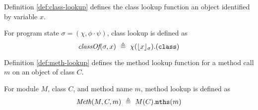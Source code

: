 Definition \ref{def:class-lookup} defines the class lookup function an object 
identified by variable $x$.
\begin{definition}
\label{def:class-lookup}
For program state $\sigma = (\chi, \phi \cdot\psi)$, class lookup is defined as 
$$\class{\sigma}{x}\ \triangleq\ \chi(\interpret{\sigma}{x}).(\prg{class})$$
\end{definition}

Definition \ref{def:meth-lookup} defines the method lookup function for a method
call $m$ on an object of class $C$.
\begin{definition}
\label{def:meth-lookup}
For module $M$, class $C$, and method name $m$, method lookup is defined as 
$$\meth{M}{C}{m}\ \triangleq\ M(C).\prg{mths}(m)$$
\end{definition}

